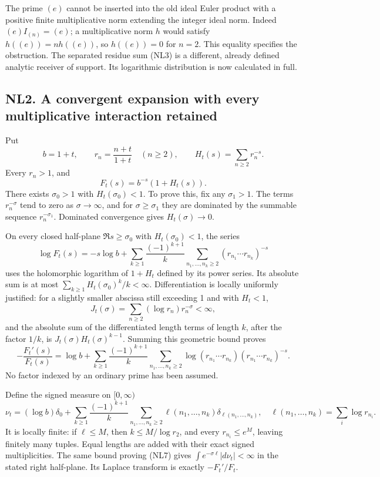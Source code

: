 \documentclass[
  10pt,
  a4paper,
]{article}
\begin{document}
The prime \((e)\) cannot be inserted into the old ideal Euler product
with a positive finite multiplicative norm extending the integer ideal
norm. Indeed \((e)I_{(n)}=(e)\); a multiplicative norm \(h\) would
satisfy \(h((e))=n h((e))\), so \(h((e))=0\) for \(n=2\). This equality
specifies the obstruction. The separated residue sum (NL3) is a
different, already defined analytic receiver of support. Its logarithmic
distribution is now calculated in full.

\subsection{NL2. A convergent expansion with every multiplicative
interaction
retained}\label{nl2.-a-convergent-expansion-with-every-multiplicative-interaction-retained}

Put \[
b=1+t,\qquad r_n=\frac{n+t}{1+t}\quad(n\ge2),\qquad
H_t(s)=\sum_{n\ge2}r_n^{-s}.
\tag{NL4}
\] Every \(r_n>1\), and \[
F_t(s)=b^{-s}(1+H_t(s)).
\tag{NL5}
\] There exists \(\sigma_0>1\) with \(H_t(\sigma_0)<1\). To prove this,
fix any \(\sigma_1>1\). The terms \(r_n^{-\sigma}\) tend to zero as
\(\sigma\to\infty\), and for \(\sigma\ge\sigma_1\) they are dominated by
the summable sequence \(r_n^{-\sigma_1}\). Dominated convergence gives
\(H_t(\sigma)\to0\).

On every closed half-plane \(\Re s\ge\sigma_0\) with
\(H_t(\sigma_0)<1\), the series \[
\log F_t(s)=-s\log b+
\sum_{k\ge1}\frac{(-1)^{k+1}}{k}
\sum_{n_1,\ldots,n_k\ge2}
(r_{n_1}\cdots r_{n_k})^{-s}
\tag{NL6}
\] uses the holomorphic logarithm of \(1+H_t\) defined by its power
series. Its absolute sum is at most
\(\sum_{k\ge1}H_t(\sigma_0)^k/k<\infty\). Differentiation is locally
uniformly justified: for a slightly smaller abscissa still exceeding 1
and with \(H_t<1\), \[
J_t(\sigma)=\sum_{n\ge2}(\log r_n)r_n^{-\sigma}<\infty,
\] and the absolute sum of the differentiated length terms of length
\(k\), after the factor \(1/k\), is \(J_t(\sigma)H_t(\sigma)^{k-1}\).
Summing this geometric bound proves \[
-\frac{F_t'(s)}{F_t(s)}
=\log b+
\sum_{k\ge1}\frac{(-1)^{k+1}}{k}
\sum_{n_1,\ldots,n_k\ge2}
\log(r_{n_1}\cdots r_{n_k})
(r_{n_1}\cdots r_{n_k})^{-s}.
\tag{NL7}
\] No factor indexed by an ordinary prime has been assumed.

Define the signed measure on \([0,\infty)\) \[
\nu_t=(\log b)\delta_0+
\sum_{k\ge1}\frac{(-1)^{k+1}}k
\sum_{n_1,\ldots,n_k\ge2}
\ell(n_1,\ldots,n_k)\delta_{\ell(n_1,\ldots,n_k)},
\quad
\ell(n_1,\ldots,n_k)=\sum_i\log r_{n_i}.
\tag{NL8}
\] It is locally finite: if \(\ell\le M\), then \(k\le M/\log r_2\), and
every \(r_{n_i}\le e^M\), leaving finitely many tuples. Equal lengths
are added with their exact signed multiplicities. The same bound proving
(NL7) gives \(\int e^{-\sigma\ell}|d\nu_t|<\infty\) in the stated right
half-plane. Its Laplace transform is exactly \(-F_t'/F_t\).
\end{document}
